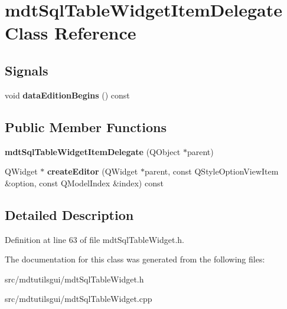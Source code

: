 \hypertarget{classmdt_sql_table_widget_item_delegate}{
\section{mdtSqlTableWidgetItemDelegate Class Reference}
\label{classmdt_sql_table_widget_item_delegate}
}
\subsection*{Signals}
\begin{DoxyCompactItemize}
\item 
\hypertarget{classmdt_sql_table_widget_item_delegate_af2fdf7d0a1ead61dccdb047240e96643}{
void {\bfseries dataEditionBegins} () const }
\label{classmdt_sql_table_widget_item_delegate_af2fdf7d0a1ead61dccdb047240e96643}

\end{DoxyCompactItemize}
\subsection*{Public Member Functions}
\begin{DoxyCompactItemize}
\item 
\hypertarget{classmdt_sql_table_widget_item_delegate_a47f657db0c8746f989758df47e68e6dd}{
{\bfseries mdtSqlTableWidgetItemDelegate} (QObject $\ast$parent)}
\label{classmdt_sql_table_widget_item_delegate_a47f657db0c8746f989758df47e68e6dd}

\item 
\hypertarget{classmdt_sql_table_widget_item_delegate_aed1fee59493153f5553e96dfceaddc81}{
QWidget $\ast$ {\bfseries createEditor} (QWidget $\ast$parent, const QStyleOptionViewItem \&option, const QModelIndex \&index) const }
\label{classmdt_sql_table_widget_item_delegate_aed1fee59493153f5553e96dfceaddc81}

\end{DoxyCompactItemize}


\subsection{Detailed Description}


Definition at line 63 of file mdtSqlTableWidget.h.



The documentation for this class was generated from the following files:\begin{DoxyCompactItemize}
\item 
src/mdtutilsgui/mdtSqlTableWidget.h\item 
src/mdtutilsgui/mdtSqlTableWidget.cpp\end{DoxyCompactItemize}
